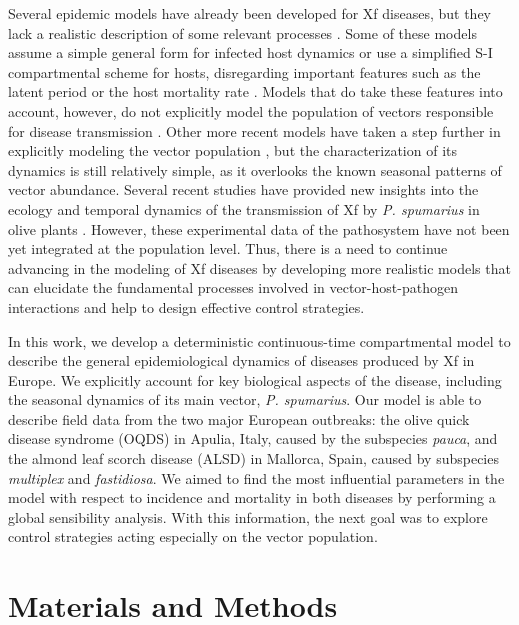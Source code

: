 Several epidemic models have already been developed for Xf diseases, but
they lack a realistic description of some relevant processes \cite{Jeger2019}.
Some of these models assume a simple general form for infected host dynamics
\cite{White2017,Abboud2019,Daugherty2019} or use a simplified S-I compartmental
scheme for hosts, disregarding important features
such as the latent period or the host mortality rate \cite{Soubeyrand2018}.
Models that do take these features into account, however, do not explicitly
model the population of vectors responsible for disease transmission
\cite{White2020}. Other more recent models have taken a step further in
explicitly modeling the vector population \cite{BRUNETTI2020,
    GimenezRomero2022_CommsBio}, but the characterization of its dynamics is
still
relatively simple, as it overlooks the known seasonal patterns of vector
abundance. Several recent studies have provided new insights into the ecology
and temporal dynamics of the transmission of Xf by \textit{P. spumarius} in
olive plants \cite{Bodino2021,bodino2019phenology}. However, these
experimental data of the pathosystem have not been yet integrated at the
population level. Thus, there is a need to continue advancing in the modeling
of Xf diseases by developing more realistic models that can elucidate the
fundamental processes involved in vector-host-pathogen interactions and help to
design effective control strategies.

In this work, we develop a deterministic continuous-time compartmental
model to describe the general epidemiological dynamics of diseases produced by
Xf in Europe. We explicitly account for key biological aspects of the disease,
including the seasonal dynamics of its main vector, \textit{P. spumarius}. Our
model is able to describe field data from the two major European outbreaks: the
olive quick disease syndrome (OQDS) in Apulia, Italy, caused by the subspecies
\textit{pauca}, and the almond leaf scorch disease (ALSD) in Mallorca, Spain,
caused by subspecies \textit{multiplex} and \textit{fastidiosa}. We aimed to
find the most influential parameters in the model with respect to incidence and
mortality in both diseases by performing a global sensibility analysis. With
this information, the next goal was to explore control strategies acting
especially on the vector population.

\section{Materials and Methods}

